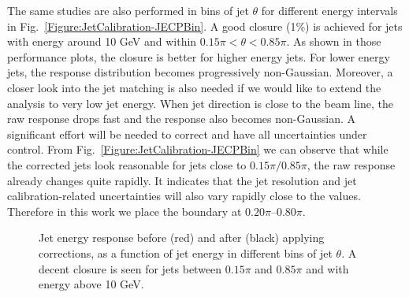 The same studies are also performed in bins of jet $\theta$ for different energy intervals in Fig.~\ref{Figure:JetCalibration-JECPBin}.
A good closure (1\%) is achieved for jets with energy around 10 GeV and within $0.15\pi < \theta < 0.85\pi$.  As shown in those performance plots, the closure is better for higher energy jets.
For lower energy jets, the response distribution becomes progressively non-Gaussian. Moreover,  a closer look into the jet matching is also needed if we would like to extend the analysis to very low jet energy.
When jet direction is close to the beam line, the raw response drops fast and the response also becomes non-Gaussian.  A significant effort will be needed to correct and have all uncertainties under control.  From Fig.~\ref{Figure:JetCalibration-JECPBin} we can observe that while the corrected jets look reasonable for jets close to $0.15\pi / 0.85\pi$, the raw response already changes quite rapidly.  It indicates that the jet resolution and jet calibration-related uncertainties will also vary rapidly close to the values.  Therefore in this work we place the boundary at $0.20\pi$--$0.80\pi$.


\begin{figure}[htp!]
    \centering
    \caption{Jet energy response before (red) and after (black) applying corrections, as a function of jet energy in different bins of jet $\theta$.  A decent closure is seen for jets between $0.15\pi$ and $0.85\pi$ and with energy above 10 GeV.}
    \label{Figure:JetCalibration-JECThetaBin}
\end{figure}

